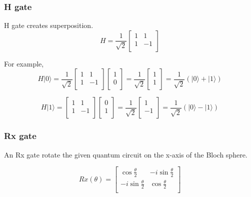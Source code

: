 \subsubsection{H gate}

H gate creates superposition.
$$ H = \frac{1}{\sqrt{2}}\begin{bmatrix}
1 & 1\\
1 & -1 \\
\end{bmatrix}
$$

For example,
$$ H|0\rangle = \frac{1}{\sqrt{2}}\begin{bmatrix}
1 & 1\\
1 & -1 \\
\end{bmatrix}\left[
\begin{array}{c}
1 \\
0 \\
\end{array}
\right]
= \frac{1}{\sqrt{2}} \left[
\begin{array}{c}
1 \\
1 \\
\end{array}
\right]
= \frac{1}{\sqrt{2}} (|0\rangle + |1\rangle)
$$

$$ H|1\rangle = \begin{bmatrix}
1 & 1\\
1 & -1 \\
\end{bmatrix} 
\left[
\begin{array}{c}
0 \\
1  \\
\end{array}
\right]
= \frac{1}{\sqrt{2}} \left[
\begin{array}{c}
1 \\
-1 \\
\end{array}
\right]
=\frac{1}{\sqrt{2}} (|0\rangle - |1\rangle)
$$

\subsubsection{Rx gate}
 An Rx gate rotate the given quantum circuit on the x-axis of the Bloch sphere.
 
 $$ Rx(\theta) = \begin{bmatrix}
\cos{\frac{\theta}{2}} & -i\sin{\frac{\theta}{2}} \\
 -i\sin{\frac{\theta}{2}} & \cos{\frac{\theta}{2}}  \\
\end{bmatrix}
$$
 

